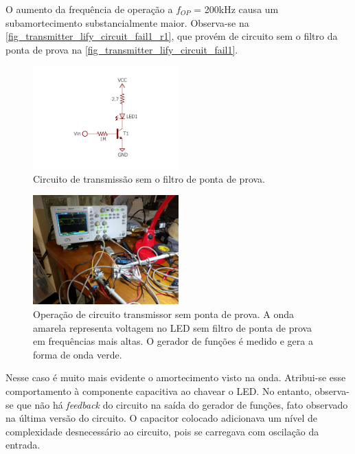 	O aumento da frequência de operação a $f_{OP}$ = 200kHz causa um subamortecimento substancialmente maior. Observa-se na \autoref{fig_transmitter_lify_circuit_fail1_r1}, que provém de circuito sem o filtro da ponta de prova na \autoref{fig_transmitter_lify_circuit_fail1}.
	\begin{figure}[h!]
		\caption{\label{fig_transmitter_lify_circuit_fail1}Circuito de transmissão sem o filtro de ponta de prova.}
		\centering
		\includegraphics[width=0.5\textwidth, trim={2cm 2cm 2cm 2.3cm}, clip]{circuits/transmitter_fail1.pdf}
	\end{figure}
	\begin{figure}[h!]
		\caption{\label{fig_transmitter_lify_circuit_fail1_r1}Operação de circuito transmissor sem ponta de prova. A onda amarela representa voltagem no LED sem filtro de ponta de prova em frequências mais altas. O gerador de funções é medido e gera a forma de onda verde.}
		\centering
		\includegraphics[width=0.5\textwidth, trim={22.5cm 69cm 87cm 16cm}, clip]{circuits/photos/TX_200k_without_filter.jpg}
	\end{figure}
	Nesse caso é muito mais evidente o amortecimento visto na onda. Atribui-se esse comportamento à componente capacitiva ao chavear o LED. No entanto, observa-se que não há \textit{feedback} do circuito na saída do gerador de funções, fato observado na última versão do circuito. O capacitor colocado adicionava um nível de complexidade desnecessário ao circuito, pois se carregava com oscilação da entrada. 
	
